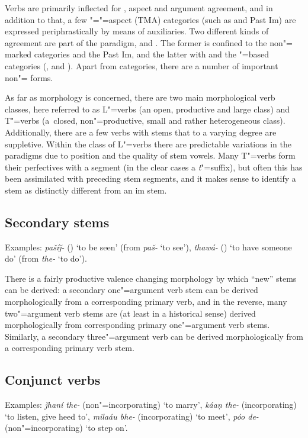 Verbs are primarily inflected for , aspect and argument agreement, and in addition to that, a few "="=aspect (TMA) categories (such as  and Past Im) are expressed periphrastically by means of auxiliaries. Two different kinds of agreement are part of the paradigm,  and . The former is confined to the non"= marked categories  and the Past Im, and the latter with  and the "=based categories (,  and ). Apart from   categories, there are a number of important non"= forms.


As far as  morphology is concerned, there are two main morphological verb classes, here referred to as L"=verbs (an open, productive and large class) and T"=verbs (a~closed, non"=productive, small and rather heterogeneous class). Additionally, there are a few verbs with stems that to a varying degree are suppletive. Within the class of L"=verbs there are predictable variations in the  paradigms due to  position and the quality of stem vowels. Many T"=verbs form their perfectives with a  segment (in the clear cases a \textit{t}"=suffix), but often this has been assimilated with preceding stem segments, and it makes sense to identify a  stem as distinctly different from an im stem.


\subsection{Secondary stems}
\label{subsec:3b-3-1}
Examples: \textit{pašíǰ-} () `to be seen' (from \textit{paš-} `to see'), \textit{thawá-} () `to have someone do' (from \textit{the-} `to do').


There is a fairly productive valence changing morphology by which “new” stems can be derived: a secondary one"=argument verb stem can be derived morphologically from a corresponding primary  verb, and in the reverse, many two"=argument verb stems are (at least in a historical sense) derived morphologically from corresponding primary one"=argument verb stems. Similarly, a secondary three"=argument verb can be derived morphologically from a corresponding primary  verb stem. 


\subsection{Conjunct verbs}
\label{subsec:3b-3-2}
Examples: \textit{ǰhaní the-} (non"=incorporating) `to marry', \textit{káaṇ the-} (incorporating) `to listen, give heed to', \textit{milaáu bhe-} (incorporating) `to meet', \textit{póo de-} (non"=incorporating) `to step on'.


